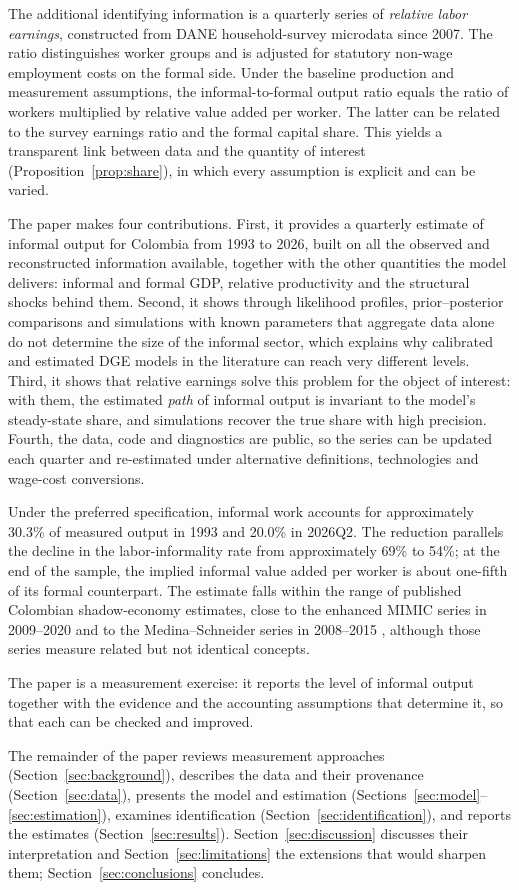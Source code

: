 The additional identifying information is a quarterly series of \emph{relative labor earnings}, constructed from DANE household-survey microdata since 2007. The ratio distinguishes worker groups and is adjusted for statutory non-wage employment costs on the formal side. Under the baseline production and measurement assumptions, the informal-to-formal output ratio equals the ratio of workers multiplied by relative value added per worker. The latter can be related to the survey earnings ratio and the formal capital share. This yields a transparent link between data and the quantity of interest (Proposition~\ref{prop:share}), in which every assumption is explicit and can be varied.

The paper makes four contributions. First, it provides a quarterly estimate of informal output for Colombia from 1993 to 2026, built on all the observed and reconstructed information available, together with the other quantities the model delivers: informal and formal GDP, relative productivity and the structural shocks behind them. Second, it shows through likelihood profiles, prior--posterior comparisons and simulations with known parameters that aggregate data alone do not determine the size of the informal sector, which explains why calibrated and estimated DGE models in the literature can reach very different levels. Third, it shows that relative earnings solve this problem for the object of interest: with them, the estimated \emph{path} of informal output is invariant to the model's steady-state share, and simulations recover the true share with high precision. Fourth, the data, code and diagnostics are public, so the series can be updated each quarter and re-estimated under alternative definitions, technologies and wage-cost conversions.

Under the preferred specification, informal work accounts for approximately 30.3\% of measured output in 1993 and 20.0\% in 2026Q2. The reduction parallels the decline in the labor-informality rate from approximately 69\% to 54\%; at the end of the sample, the implied informal value added per worker is about one-fifth of its formal counterpart. The estimate falls within the range of published Colombian shadow-economy estimates, close to the enhanced MIMIC series in 2009--2020 and to the Medina--Schneider series in 2008--2015 \citep{SchneiderBuehnMontenegro2010,MedinaSchneider2019,AsllaniDellAnnoSchneider2024,ElginKoseOhnsorgeYu2021}, although those series measure related but not identical concepts.

The paper is a measurement exercise: it reports the level of informal output together with the evidence and the accounting assumptions that determine it, so that each can be checked and improved.

The remainder of the paper reviews measurement approaches (Section~\ref{sec:background}), describes the data and their provenance (Section~\ref{sec:data}), presents the model and estimation (Sections~\ref{sec:model}--\ref{sec:estimation}), examines identification (Section~\ref{sec:identification}), and reports the estimates (Section~\ref{sec:results}). Section~\ref{sec:discussion} discusses their interpretation and Section~\ref{sec:limitations} the extensions that would sharpen them; Section~\ref{sec:conclusions} concludes.
